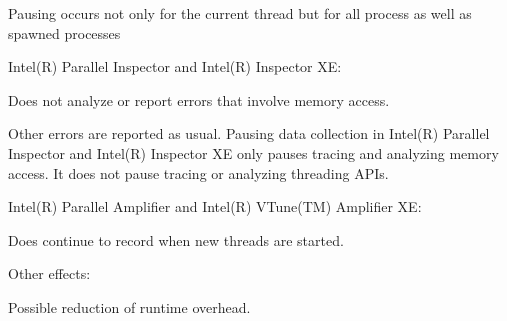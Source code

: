 Pausing occurs not only for the current thread but for all process as well as spawned processes
\begin{DoxyItemize}
\item Intel(\+R) Parallel Inspector and Intel(\+R) Inspector X\+E\+:
\begin{DoxyItemize}
\item Does not analyze or report errors that involve memory access.
\item Other errors are reported as usual. Pausing data collection in Intel(\+R) Parallel Inspector and Intel(\+R) Inspector X\+E only pauses tracing and analyzing memory access. It does not pause tracing or analyzing threading A\+P\+Is.
\end{DoxyItemize}
\item Intel(\+R) Parallel Amplifier and Intel(\+R) V\+Tune(\+T\+M) Amplifier X\+E\+:
\begin{DoxyItemize}
\item Does continue to record when new threads are started.
\end{DoxyItemize}
\item Other effects\+:
\begin{DoxyItemize}
\item Possible reduction of runtime overhead.
\end{DoxyItemize}
\end{DoxyItemize}